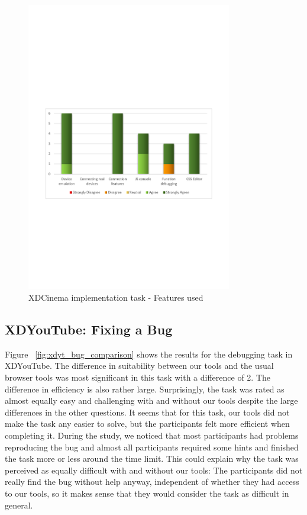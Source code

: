\begin{figure}[H]
  \centering
    \includegraphics[width=0.8\textwidth]{images/charts/xdc_impl_features_used.pdf}
	\caption{XDCinema implementation task - Features used}
	\label{fig:xdc_impl_features_used}
\end{figure}

\subsection{XDYouTube: Fixing a Bug}

Figure ~\ref{fig:xdyt_bug_comparison} shows the results for the debugging task in XDYouTube. The difference in suitability between our tools and the usual browser tools was most significant in this task with a difference of 2. The difference in efficiency is also rather large. Surprisingly, the task was rated as almost equally easy and challenging with and without our tools despite the large differences in the other questions. It seems that for this task, our tools did not make the task any easier to solve, but the participants felt more efficient when completing it. During the study, we noticed that most participants had problems reproducing the bug and almost all participants required some hints and finished the task more or less around the time limit. This could explain why the task was perceived as equally difficult with and without our tools: The participants did not really find the bug without help anyway, independent of whether they had access to our tools, so it makes sense that they would consider the task as difficult in general. 

